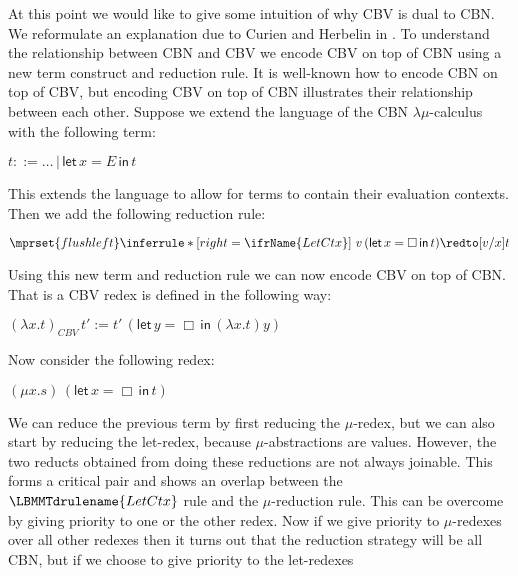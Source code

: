 At this point we would like to give some intuition of why CBV is dual
to CBN.  We reformulate an explanation due to Curien and Herbelin in
\cite{Curien:2000}.  To understand the relationship between CBN and
CBV we encode CBV on top of CBN using a new term construct and
reduction rule.  It is well-known how to encode CBN on top of CBV, but
encoding CBV on top of CBN illustrates their relationship between each
other.  Suppose we extend the language of the CBN
$\lambda\mu$-calculus with the following term:
\begin{center}
  \begin{math}
    t ::= \ldots\,|\,\textsf{let}\,x = E\,\textsf{in}\,t
  \end{math}
\end{center}
This extends the language to allow for terms to contain their evaluation
contexts.  Then we add the following reduction rule:
\begin{center}
  \begin{math}
    $$\mprset{flushleft}
    \inferrule* [right=\ifrName{LetCtx}] {
      \ 
    }{v\,(\textsf{let}\,x = \Box\,\textsf{in}\,t) \redto [v/x]t}
  \end{math}
\end{center}
Using this new term and reduction rule we can now encode CBV on top
of CBN.  That is a CBV redex is defined in the following way:
\begin{center}
  \begin{math}
    (\lambda x.t)_{CBV}\,t' := t'\,(\textsf{let}\,y = \Box\,\textsf{in}\,(\lambda x.t) y)
  \end{math}
\end{center}
Now consider the following redex:
\begin{center}
  \begin{math}
    (\mu x.s)\,(\textsf{let}\,x = \Box\,\textsf{in}\,t)
  \end{math}
\end{center}
We can reduce the previous term by first reducing the $\mu$-redex, but
we can also start by reducing the let-redex, because
$\mu$-abstractions are values. However, the two reducts obtained from
doing these reductions are not always joinable.  This forms a critical
pair and shows an overlap between the $\LBMMTdrulename{\normalsize LetCtx}$ rule
and the $\mu$-reduction rule.  This can be overcome by giving priority
to one or the other redex.  Now if we give priority to $\mu$-redexes
over all other redexes then it turns out that the reduction strategy
will be all CBN, but if we choose to give priority to the let-redexes
